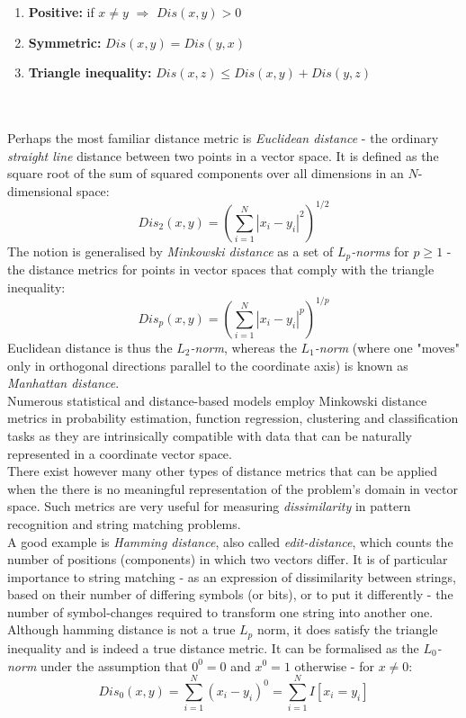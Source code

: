 \documentclass[12pt]{extarticle}
\begin{document}
\begin{enumerate}
\item \textbf{Positive:  }if $x\neq y$ $\Rightarrow$ $Dis(x,y)>0$
\item \textbf{Symmetric: }$Dis(x,y) = Dis(y,x)$
\item \textbf{Triangle inequality: }$Dis(x,z) \leq Dis(x,y) + Dis(y,z)$
\end{enumerate}

\noindent \\ \\Perhaps the most familiar distance metric is \textit{Euclidean distance} - the ordinary \textit{straight line} distance between two points in a vector space. It is defined as the square root of the sum of squared components over all dimensions in an $N$-dimensional space:
\begin{equation}
Dis_2 (x,y) = (\sum_{i=1}^{N} |x_i - y_i|^2)^{1/2}
\end{equation}
The notion is generalised by \textit{Minkowski distance} as a set of $L_p$\textit{-norms} for $p\geq1$ - the distance metrics for points in vector spaces that comply with the triangle inequality:
\begin{equation} 
Dis_p (x,y) = (\sum_{i=1}^{N} |x_i - y_i|^p)^{1/p}
\end{equation}
Euclidean distance is thus the $L_2$\textit{-norm}, whereas the $L_1$\textit{-norm} (where one "moves" only in orthogonal directions parallel to the coordinate axis) is known as \textit{Manhattan distance}.\\

\noindent Numerous statistical and distance-based models employ Minkowski distance metrics in probability estimation, function regression, clustering and classification tasks as they are intrinsically compatible with data that can be naturally represented in a coordinate vector space.\\

\noindent There exist however many other types of distance metrics that can be applied when the there is no meaningful representation of the problem's domain in vector space. Such metrics are very useful for measuring \textit{dissimilarity} in pattern recognition and string matching problems.\\

\noindent A good example is \textit{Hamming distance}, also called \textit{edit-distance}, which counts the number of positions (components) in which two vectors differ. It is of particular importance to string matching - as an expression of dissimilarity between strings, based on their number of differing symbols (or bits), or to put it differently - the number of symbol-changes required to transform one string into another one. Although hamming distance is not a true $L_p$ norm, it does satisfy the triangle inequality and is indeed a true distance metric. It can be formalised as the $L_0$\textit{-norm} under the assumption that $0^0=0$ and $x^0=1$ otherwise - for $x\neq0$:
\begin{equation}
Dis_0(x,y)=\sum_{i=1}^{N}(x_i-y_i)^0=\sum_{i=1}^{N} I[x_i=y_i]
\end{equation}
\end{document}
